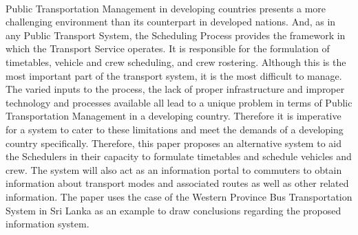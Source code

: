 \paragraph{} Public Transportation Management in developing countries presents a more challenging environment than its counterpart in developed nations. And, as in any Public Transport System, the Scheduling Process provides the framework in which the Transport Service operates. It is responsible for the formulation of timetables, vehicle and crew scheduling, and crew rostering. Although this is the most important part of the transport system, it is the most difficult to manage. The varied inputs to the process, the lack of proper infrastructure and improper technology and processes available all lead to a unique problem in terms of Public Transportation Management in a developing country. Therefore it is imperative for a system to cater to these limitations and meet the demands of a developing country specifically. Therefore, this paper proposes an alternative system to aid the Schedulers in their capacity to formulate timetables and schedule vehicles and crew. The system will also act as an information portal to commuters to obtain information about transport modes and associated routes as well as other related information. The paper uses the case of the Western Province Bus Transportation System in Sri Lanka as an example to draw conclusions regarding the proposed information system.


